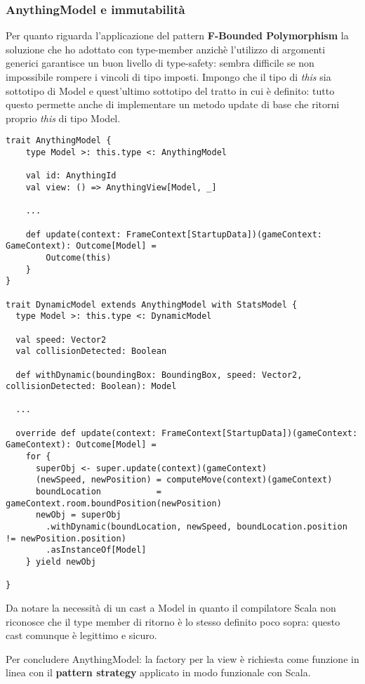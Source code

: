 \subsubsection{AnythingModel e immutabilità}
Per quanto riguarda l'applicazione del pattern \textbf{F-Bounded Polymorphism} la soluzione che ho adottato con type-member anzichè l'utilizzo di argomenti generici garantisce un buon livello di type-safety: sembra difficile se non impossibile rompere i vincoli di tipo imposti.  
Impongo che il tipo di \textit{this} sia sottotipo di Model e quest'ultimo sottotipo del tratto in cui è definito: tutto questo permette anche di implementare un metodo update di base che ritorni proprio \textit{this} di tipo Model.
\begin{lstlisting}[basicstyle=\tiny]
trait AnythingModel {
    type Model >: this.type <: AnythingModel
    
    val id: AnythingId
    val view: () => AnythingView[Model, _]

    ...

    def update(context: FrameContext[StartupData])(gameContext: GameContext): Outcome[Model] =
        Outcome(this)
    }
}  

trait DynamicModel extends AnythingModel with StatsModel {
  type Model >: this.type <: DynamicModel

  val speed: Vector2
  val collisionDetected: Boolean

  def withDynamic(boundingBox: BoundingBox, speed: Vector2, collisionDetected: Boolean): Model

  ...

  override def update(context: FrameContext[StartupData])(gameContext: GameContext): Outcome[Model] =
    for {
      superObj <- super.update(context)(gameContext)
      (newSpeed, newPosition) = computeMove(context)(gameContext)
      boundLocation           = gameContext.room.boundPosition(newPosition)
      newObj = superObj
        .withDynamic(boundLocation, newSpeed, boundLocation.position != newPosition.position)
        .asInstanceOf[Model]
    } yield newObj

} 
\end{lstlisting}

Da notare la necessità di un cast a Model in quanto il compilatore Scala non riconosce che il type member di ritorno è lo stesso definito poco sopra: questo cast comunque è legittimo e sicuro. 

Per concludere AnythingModel: la factory per la view è richiesta come funzione in linea con il \textbf{pattern strategy} applicato in modo funzionale con Scala.

